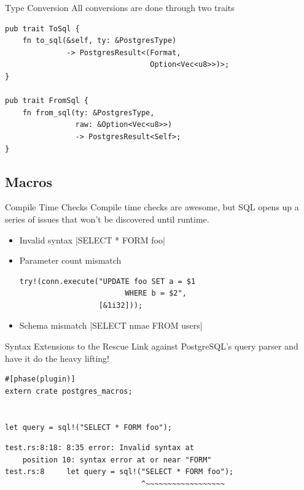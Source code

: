 \documentclass{beamer}
\begin{document}
\begin{frame}[fragile]{Type Conversion}
    All conversions are done through two traits
    \begin{verbatim}
pub trait ToSql {
    fn to_sql(&self, ty: &PostgresType)
              -> PostgresResult<(Format,
                                 Option<Vec<u8>>)>;
} 

pub trait FromSql {
    fn from_sql(ty: &PostgresType,
                raw: &Option<Vec<u8>>)
                -> PostgresResult<Self>;
}
    \end{verbatim}
\end{frame}

\subsection{Macros}

\begin{frame}[fragile]{Compile Time Checks}
    Compile time checks are awesome, but SQL opens up a series of issues that
    won't be discovered until runtime.
    \begin{itemize}
        \item Invalid syntax |SELECT * FORM foo|
        \item Parameter count mismatch
        \begin{verbatim}
try!(conn.execute("UPDATE foo SET a = $1
                        WHERE b = $2",
                  [&1i32]));
        \end{verbatim}
        \item Schema mismatch |SELECT nmae FROM users|
    \end{itemize}
\end{frame}

\begin{frame}[fragile]{Syntax Extensions to the Rescue}
    Link against PostgreSQL's query parser and have it do the heavy lifting!
    \begin{verbatim}
#[phase(plugin)]
extern crate postgres_macros;


let query = sql!("SELECT * FORM foo");
    \end{verbatim}
    \begin{verbatim}
test.rs:8:18: 8:35 error: Invalid syntax at
    position 10: syntax error at or near "FORM"
test.rs:8     let query = sql!("SELECT * FORM foo");
                               ^~~~~~~~~~~~~~~~~~~
    \end{verbatim}
\end{frame}
\end{document}
